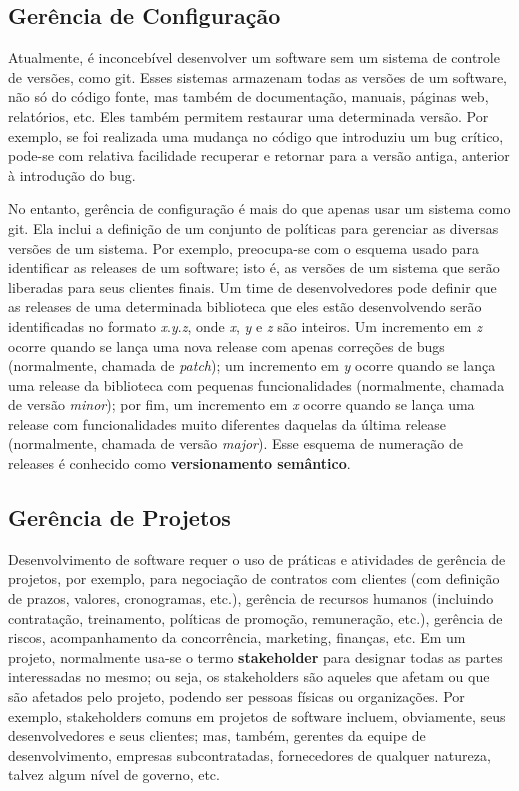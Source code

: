 \documentclass[
  11pt,
  twoside]{book}
\begin{document}
\hypertarget{geruxeancia-de-configurauxe7uxe3o}{%
\subsection{Gerência de
Configuração}\label{geruxeancia-de-configurauxe7uxe3o}}

 Atualmente, é inconcebível desenvolver
um software sem um sistema de controle de versões, como git. Esses
sistemas armazenam todas as versões de um software, não só do código
fonte, mas também de documentação, manuais, páginas web, relatórios,
etc. Eles também permitem restaurar uma determinada versão. Por exemplo,
se foi realizada uma mudança no código que introduziu um bug crítico,
pode-se com relativa facilidade recuperar e retornar para a versão
antiga, anterior à introdução do bug.

 No entanto, gerência de configuração é
mais do que apenas usar um sistema como git. Ela inclui a definição de
um conjunto de políticas para gerenciar as diversas versões de um
sistema. Por exemplo, preocupa-se com o esquema usado para identificar
as releases de um software; isto é, as versões de um sistema que serão
liberadas para seus clientes finais. Um time de desenvolvedores pode
definir que as releases de uma determinada biblioteca que eles estão
desenvolvendo serão identificadas no formato \emph{x}.\emph{y}.\emph{z},
onde \emph{x}, \emph{y} e \emph{z} são inteiros. Um incremento em
\emph{z} ocorre quando se lança uma nova release com apenas correções de
bugs (normalmente, chamada de \emph{patch}); um incremento em \emph{y}
ocorre quando se lança uma release da biblioteca com pequenas
funcionalidades (normalmente, chamada de versão \emph{minor}); por fim,
um incremento em \emph{x} ocorre quando se lança uma release com
funcionalidades muito diferentes daquelas da última release
(normalmente, chamada de versão \emph{major}). Esse esquema de numeração
de releases é conhecido como \textbf{versionamento semântico}.

\hypertarget{geruxeancia-de-projetos}{%
\subsection{Gerência de Projetos}\label{geruxeancia-de-projetos}}

  Desenvolvimento de
software requer o uso de práticas e atividades de gerência de projetos,
por exemplo, para negociação de contratos com clientes (com definição de
prazos, valores, cronogramas, etc.), gerência de recursos humanos
(incluindo contratação, treinamento, políticas de promoção, remuneração,
etc.), gerência de riscos, acompanhamento da concorrência, marketing,
finanças, etc. Em um projeto, normalmente usa-se o termo
\textbf{stakeholder} para designar todas as partes interessadas no
mesmo; ou seja, os stakeholders são aqueles que afetam ou que são
afetados pelo projeto, podendo ser pessoas físicas ou organizações. Por
exemplo, stakeholders comuns em projetos de software incluem,
obviamente, seus desenvolvedores e seus clientes; mas, também, gerentes
da equipe de desenvolvimento, empresas subcontratadas, fornecedores de
qualquer natureza, talvez algum nível de governo, etc.
\end{document}
